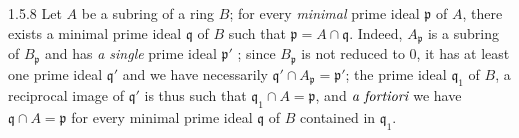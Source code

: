 \begin{env}{1.5.8}
\label{env-0.1.5.8}
Let $A$ be a subring of a ring $B$; for every \emph{minimal} prime ideal $\mathfrak{p}$ of $A$, there
exists a minimal prime ideal $\mathfrak{q}$ of $B$ such that $\mathfrak{p}=A\cap\mathfrak{q}$. Indeed, $A_\mathfrak{p}$
is a subring of $B_\mathfrak{p}$  and has \emph{a single} prime ideal $\mathfrak{p}'$ ; since
$B_\mathfrak{p}$ is not reduced to $0$, it has at least one prime ideal $\mathfrak{q}'$ and we have
necessarily $\mathfrak{q}'\cap A_\mathfrak{p}=\mathfrak{p}'$; the prime ideal $\mathfrak{q}_1$ of $B$, a reciprocal image
of $\mathfrak{q}'$ is thus such that $\mathfrak{q}_1\cap A=\mathfrak{p}$, and $\emph{a fortiori}$ we have
$\mathfrak{q}\cap A=\mathfrak{p}$ for every minimal prime ideal $\mathfrak{q}$ of $B$ contained in $\mathfrak{q}_1$.
\end{env}


